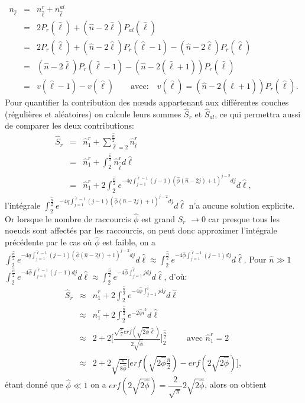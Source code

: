 \begin{eqnarray}\nonumber
n_{\hat{\ell}}&=&n_{\hat{\ell}}^{r}+n_{\hat{\ell}}^{al}\\\nonumber
&=&2P_r(\hat{\ell})+(\hat{n}-2\hat{\ell})P_{al}(\hat{\ell})\\\nonumber
&=&2P_r(\hat{\ell})+(\hat{n}-2\hat{\ell})P_r(\hat{\ell}-1)-(\hat{n}-2\hat{\ell})P_r(\hat{\ell})\\\nonumber
&=&(\hat{n}-2\hat{\ell})P_r(\hat{\ell}-1)-(\hat{n}-2(\hat{\ell}+1))P_r(\hat{\ell})\\
&=&v(\hat{\ell}-1)-v(\hat{\ell}) \quad \quad  \text{avec:} \quad v(\hat{\ell})=(\hat{n}-2(\hat{\ell}+1))P_r(\hat{\ell}).
\label{c}
\end{eqnarray}
Pour quantifier la contribution des nœuds appartenant aux différentes couches (régulières et aléatoires) on calcule leurs sommes $\hat{S}_r$  et $\hat{S}_{al}$, ce qui permettra aussi de comparer les deux contributions:
\begin{eqnarray}\nonumber
\hat{S}_r &=&\hat{n}_{1}^{r}+\sum^{\frac{\hat{n}}{2}}_{\hat{\ell}=2}\hat{n}_{\hat{\ell}}^{r}\\\nonumber
&=&\hat{n}_{1}^{r}+\int^{\frac{\hat{n}}{2}}_2\hat{n}_{\hat{\hat{\ell}}}^{r}d\hat{\ell}\\
&=&\hat{n}_{1}^{r}+2\int^{\frac{\hat{n}}{2}}_2e^{-4q\int_{j=1}^{\hat{\ell}-1}(j-1)(\hat{\phi}(\hat{n}-2j)+1)^{j-2}dj}d\hat{\ell},
\label{ssr}
\end{eqnarray}
l'intégrale $\int^{\frac{\hat{n}}{2}}_2e^{-4q\int_{j=1}^{\hat{\ell}-1}(j-1)(\hat{\phi}(\hat{n}-2j)+1)^{j-2}dj}d\hat{\ell}$ n'a aucune solution explicite. Or lorsque le nombre de raccourcis $\hat{\phi}$ est grand $\hat{S}_r$ $\longrightarrow 0$ car presque tous les noeuds sont affectés par les raccourcis, on peut donc approximer l'intégrale précédente par le cas où $\hat{\phi}$ est faible, on a
$\int^{\frac{\hat{n}}{2}}_2e^{-4q\int_{j=1}^{\hat{\ell}-1}(j-1)(\hat{\phi}(\hat{n}-2j)+1)^{j-2}dj}d\hat{\ell}\approx\int^{\frac{\hat{n}}{2}}_2e^{-4\hat{\phi}\int_{j=1}^{\hat{\ell}-1}(j-1)dj}d\hat{\ell}$.
Pour $\hat{n}\gg 1$  $ \int^{\frac{\hat{n}}{2}}_2e^{-4\hat{\phi}\int_{j=1}^{\hat{\ell}-1}(j-1)dj}d\hat{\ell}\approx\int^{\frac{\hat{n}}{2}}_2e^{-4\hat{\phi}\int_{j=1}^{\hat{\ell}}jdj}d\hat{\ell}$,
d'où:
\begin{eqnarray}\nonumber
\label{sr}
\hat{S}_r &\approx&\hat{n}_{1}^{r}+2\int^{\frac{\hat{n}}{2}}_2e^{-4\hat{\phi}\int_{j=1}^{i}jdj}d\hat{\ell}\\\nonumber
&\approx&\hat{n}_{1}^{r}+2\int^{\frac{\hat{n}}{2}}_2e^{-2\hat{\phi}i^2}d\hat{\ell}\\\nonumber
&\approx&2+2\Big[\frac{\sqrt{\frac{\pi}{2}}erf(\sqrt{2\hat{\phi}}\hat{\ell})}{2\sqrt{\hat{\phi}}}\Big]^{\frac{\hat{n}}{2}}_2 \hspace{1cm}
\textrm{avec }  \hat{n}_{1}^{r}=2 \\
&\approx&2+ 2\sqrt{\frac{\pi}{8\hat{\phi}}}\Big[erf(\sqrt{2\hat{\phi}}\frac{\hat{n}}{2})-erf(2\sqrt{2\hat{\phi}})\Big],
\end{eqnarray}
étant donné que  $\hat{\phi}\ll 1$ on a $erf(2\sqrt{2\hat{\phi}})=\dfrac{2}{\sqrt{\pi}}2\sqrt{2\hat{\phi}}$, alors on obtient

